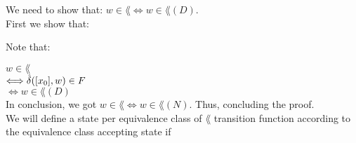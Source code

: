 We need to show that: $w \in \lang \Longleftrightarrow  w \in \lang(D)$. \\
First we show that:

Note that:

$ w \in \lang $ \\

$ \Longleftrightarrow \hat{\delta}([x_0], w) \in F $ \\

$ \Longleftrightarrow  w \in \lang(D) $ \\
In conclusion, we got $w \in \lang \Longleftrightarrow  w \in \lang(N)$. Thus, concluding the proof. \\

We will define a state per equivalence class of $\lang$
transition function according to the equivalence class
accepting state if
